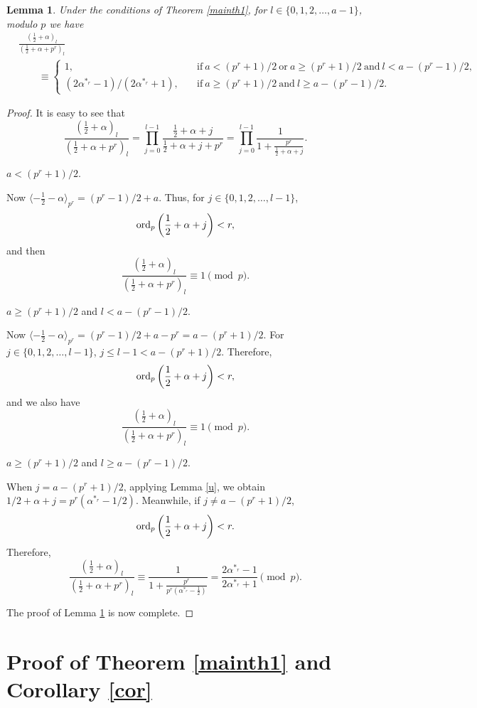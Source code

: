\documentclass[12pt,reqno]{amsart}
\def\l{\left}
\def\r{\right}
\def\t{\text}
\def\f{\frac}
\def\ord{{\rm ord}}
\def\eq{\equiv}
\def\<{\langle}
\def\>{\rangle}
\theoremstyle{plain}
\newtheorem{lemma}{Lemma}[section]
\theoremstyle{definition}
\theoremstyle{remark}
\numberwithin{equation}{section}
\begin{document}
\begin{lemma}\label{1/2+alpha}
Under the conditions of Theorem \ref{mainth1}, for $l\in\{0,1,2,\ldots,a-1\}$, modulo $p$ we have
\begin{align*}
&\f{(\f12+\alpha)_l}{(\f12+\alpha+p^r)_l}\\
&\qquad\eq \begin{cases}1,\quad&\t{if}\ a<(p^r+1)/2\ \t{or}\ a\geq(p^r+1)/2\ \t{and}\ l<a-(p^r-1)/2,\\
(2{\alpha}^{\ast_r}-1)/(2{\alpha}^{\ast_r}+1),\quad&\t{if}\ a\geq(p^r+1)/2\ \t{and}\ l\geq a-(p^r-1)/2.\end{cases}
\end{align*}
\end{lemma}

\begin{proof}
It is easy to see that
$$
\f{(\f12+\alpha)_l}{(\f12+\alpha+p^r)_l}=\prod_{j=0}^{l-1}\f{\f12+\alpha+j}{\f12+\alpha+j+p^r}=\prod_{j=0}^{l-1}\f{1}{1+\f{p^r}{\f12+\alpha+j}}.
$$

 $a<(p^r+1)/2$.

\medskip

Now $\<-\f12-\alpha\>_{p^r}=(p^r-1)/2+a$. Thus, for $j\in\{0,1,2,\ldots,l-1\}$,
$$
\ord_p\l(\f12+\alpha+j\r)<r,
$$
and then
$$
\f{(\f12+\alpha)_l}{(\f12+\alpha+p^r)_l}\eq1\pmod{p}.
$$

 $a\geq(p^r+1)/2$ and $l<a-(p^r-1)/2$.

\medskip

Now $\<-\f12-\alpha\>_{p^r}=(p^r-1)/2+a-p^r=a-(p^r+1)/2$. For $j\in\{0,1,2,\ldots,l-1\}$, $j\leq l-1<a-(p^r+1)/2$. Therefore,
$$
\ord_p\l(\f12+\alpha+j\r)<r,
$$
and we also have
$$
\f{(\f12+\alpha)_l}{(\f12+\alpha+p^r)_l}\eq1\pmod{p}.
$$

 $a\geq(p^r+1)/2$ and $l\geq a-(p^r-1)/2$.

\medskip

When $j=a-(p^r+1)/2$, applying Lemma \ref{u}, we obtain $1/2+\alpha+j=p^r(\alpha^{\ast_r}-1/2)$. Meanwhile, if $j\neq a-(p^r+1)/2$,
$$
\ord_p\l(\f12+\alpha+j\r)<r.
$$
Therefore, 
$$
\f{(\f12+\alpha)_l}{(\f12+\alpha+p^r)_l}\eq\f{1}{1+\f{p^r}{p^r(\alpha^{\ast_r}-\f12)}}=\f{2\alpha^{\ast_r}-1}{2\alpha^{\ast_r}+1}\pmod{p}.
$$

The proof of Lemma \ref{1/2+alpha} is now complete.
\end{proof}

\section{Proof of Theorem \ref{mainth1} and Corollary \ref{cor}}\label{sec3}
\end{document}
